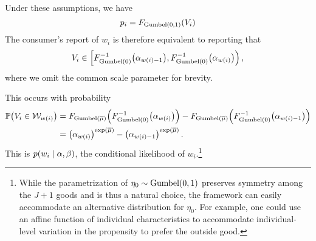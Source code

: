 \documentclass{article}
\begin{document}
Under these assumptions, we have
\begin{equation}
    p_i = F_{\text{Gumbel}\mleft(0,1\mright)}\mleft(V_i\mright)
\end{equation}
The consumer's report of $w_i$ is therefore equivalent to reporting that
\begin{equation}
    V_i \in \left[
        F^{-1}_{\text{Gumbel}\mleft(0\mright)}\mleft(\alpha_{w\mleft(i\mright)-1}\mright),
        F^{-1}_{\text{Gumbel}\mleft(0\mright)}\mleft(\alpha_{w\mleft(i\mright)}\mright)
    \right),
\end{equation}
where we omit the common scale parameter for brevity.

This occurs with probability
\begin{align}
    \mathbb{P}\mleft(V_i \in \mathcal{W}_{w\mleft(i\mright)}\mright) &= F_{\text{Gumbel}\mleft(\overline{\mu}\mright)}\mleft(F^{-1}_{\text{Gumbel}\mleft(0\mright)}\mleft(\alpha_{w\mleft(i\mright)}\mright)\mright) - F_{\text{Gumbel}\mleft(\overline{\mu}\mright)}\mleft(F^{-1}_{\text{Gumbel}\mleft(0\mright)}\mleft(\alpha_{w\mleft(i\mright)-1}\mright)\mright) \\
    &= \left({\alpha_{w\mleft(i\mright)}}\right)^{\exp\left(\overline{\mu}\right)} - \left({\alpha_{w\mleft(i\mright)-1}}\right)^{\exp\left(\overline{\mu}\right)}.
\end{align}
This is $p\mleft(w_i\mid \alpha, \beta\mright)$, the conditional likelihood of $w_i$.\footnote{While the parametrization of $\eta_0 \sim \text{Gumbel}\mleft(0,1\mright)$ preserves symmetry among the $J+1$ goods and is thus a natural choice, the framework can easily accommodate an alternative distribution for $\eta_0$. For example, one could use an affine function of individual characteristics to accommodate individual-level variation in the propensity to prefer the outside good.}
\begin{comment}
\footnote{Conditional on $w_i$ and $\symbfit{\alpha}$, the likelihood function of $\eta_{i0}$ is
\begin{equation}
    p\mleft(\eta_{i0} \mid w_i, \symbf{\alpha}\mright) = \frac{f_{\text{Gumbel}\mleft(\mu, 1\mright)}\mleft(\eta_{i0}\mright)}{\alpha_i - \alpha_{i-1}} \mathbb{1}_{\mathcal{W}_i}\mleft(\eta_{i0}\mright)
\end{equation}
where $\mu$ is the location parameter.}

Condition on $\left(\alpha, \beta\right)$, the probability of $w_i$ is
\begin{align}
    p\mleft(w_i \mid \alpha, \beta, j^*\mright) = \mathbb{P}\mleft( \eta^{(1)}_i - \eta_{i0} \in \mathcal{W}_i \mid \alpha, \beta\mright)
\end{align}
where $\eta^{(1)}_i$ is the maximum of $J$ Gumbel-distributed random variables with different location parameters $\mu_{ij} = {X_j}'\beta_i$. As is well known, this follows a Gumbel distribution with location parameter
\begin{equation}
    \overline{\mu}_i = \ln\left( \sum_{j\in\mathcal{J}} \exp\left({X_j}'\beta_i\right)\right)
\end{equation}
The difference $\eta^{(1)}-\eta_0$ is Logistic distributed with location parameter $\overline{\mu}_i$.
\end{comment}
\end{document}
